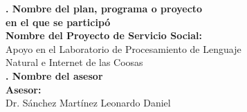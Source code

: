 \begin{center}
    \vspace{1.2cm}
    \large
    \textbf{. Nombre del plan, programa o proyecto \\en el que se participó} \\
    \vspace{.3cm}
    \normalsize
    \textbf{Nombre del Proyecto de Servicio Social:}\\
    \vspace{.1cm}
    Apoyo en el Laboratorio de Procesamiento de Lenguaje\\
    Natural e Internet de las Coosas\\

    \vspace{1.0cm}
    \large
    \textbf{. Nombre del asesor} \\
    \vspace{.3cm}
    \normalsize
    \textbf{Asesor:}\\
    \vspace{1.4cm}
    Dr. Sánchez Martínez Leonardo Daniel\\

\end{center}

\thispagestyle{empty} 
\newpage